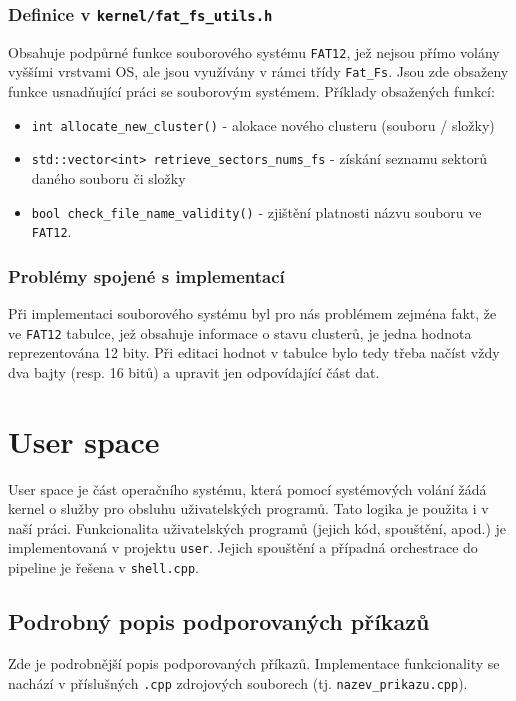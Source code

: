 \documentclass[12pt, a4paper]{article}
\let\oldsection\section
\renewcommand\section{\clearpage\oldsection}
\begin{document}
\subsubsection{Definice v \texttt{kernel/fat\_fs\_utils.h}}
Obsahuje podpůrné funkce souborového systému \texttt{FAT12}, jež nejsou přímo volány vyššími vrstvami OS, ale jsou využívány v rámci třídy \texttt{Fat\_Fs}. Jsou zde obsaženy funkce usnadňující práci se souborovým systémem. Příklady obsažených funkcí:
\begin{itemize}
    \item \texttt{int allocate\_new\_cluster()} - alokace nového clusteru (souboru / složky)
    \item \texttt{std::vector<int> retrieve\_sectors\_nums\_fs} - získání seznamu sektorů daného souboru či složky
    \item \texttt{bool check\_file\_name\_validity()} - zjištění platnosti názvu souboru ve \texttt{FAT12}.
\end{itemize}

\subsubsection{Problémy spojené s implementací}
Při implementaci souborového systému byl pro nás problémem zejména fakt, že ve \texttt{FAT12} tabulce, jež obsahuje informace o stavu clusterů, je jedna hodnota reprezentována 12 bity. Při editaci hodnot v tabulce bylo tedy třeba načíst vždy dva bajty (resp. 16 bitů) a upravit jen odpovídající část dat.

\section{User space}
	User space je část operačního systému, která pomocí systémových volání žádá kernel o služby pro obsluhu uživatelských programů. Tato logika je použita i v naší práci. Funkcionalita uživatelských programů (jejich kód, spouštění, apod.) je implementovaná v projektu \texttt{user}. Jejich spouštění a případná orchestrace do pipeline je řešena v \texttt{shell.cpp}.
	
	
	\subsection{Podrobný popis podporovaných příkazů} \label{subDetail}
	Zde je podrobnější popis podporovaných příkazů. Implementace funkcionality se nachází v příslušných \texttt{.cpp} zdrojových souborech (tj. \texttt{nazev\_prikazu.cpp}).    
    
\end{document}
